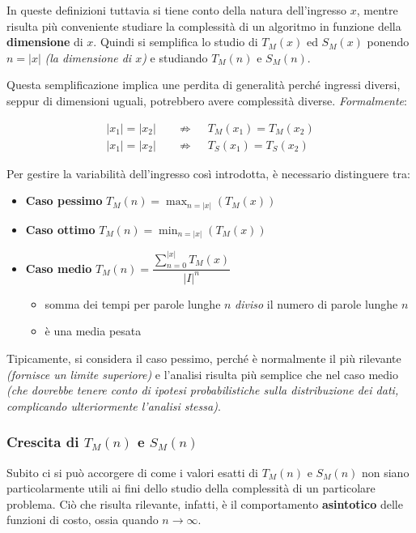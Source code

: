 \documentclass[italian, 10pt]{article}
\begin{document}
In queste definizioni tuttavia si tiene conto della natura dell'ingresso \(x\), mentre risulta più conveniente studiare la complessità di un algoritmo in funzione della \textbf{dimensione} di \(x\).
Quindi si semplifica lo studio di \(T_M(x)\) ed \(S_M(x)\) ponendo \(n = |x|\) \textit{(la dimensione di \(x\))} e studiando \(T_M(n)\) e \(S_M(n)\).

Questa semplificazione implica une perdita di generalità perché ingressi diversi, seppur di dimensioni uguali, potrebbero avere complessità diverse.
\textit{Formalmente}:

\begin{align*}
  |x_1| = |x_2| \quad & \nRightarrow \quad \ T_M(x_1) = T_M(x_2) \\
  |x_1| = |x_2| \quad & \nRightarrow \quad \ T_S(x_1) = T_S(x_2)
\end{align*}

\bigskip
Per gestire la variabilità dell'ingresso così introdotta, è necessario distinguere tra:
\begin{itemize}[itemsep=5pt]
  \item \textbf{Caso pessimo} \(T_M(n) = \displaystyle \max_{n = |x|} \left(T_M(x)\right) \)
  \item \textbf{Caso ottimo} \(T_M(n) = \displaystyle \min_{n = |x|} \left(T_M(x)\right) \)
  \item \textbf{Caso medio} \(T_M(n) = \dfrac{\displaystyle \sum_{n = 0}^{|x|} T_M(x)}{|I|^n} \)
        \begin{itemize}[label=\(\rightarrow\)]
          \item somma dei tempi per parole lunghe \(n\) \textit{diviso} il numero di parole lunghe \(n\)
          \item è una media pesata
        \end{itemize}
\end{itemize}

Tipicamente, si considera il caso pessimo, perché è normalmente il più rilevante \textit{(fornisce un limite superiore)} e l'analisi risulta più semplice che nel caso medio \textit{(che dovrebbe tenere conto di ipotesi probabilistiche sulla distribuzione dei dati, complicando ulteriormente l'analisi stessa)}.

\subsubsection[Crescita di T(n) e S(n)]{Crescita di \(T_M(n)\) e \(S_M(n)\)}

Subito ci si può accorgere di come i valori esatti di \(T_M(n)\) e \(S_M(n)\) non siano particolarmente utili ai fini dello studio della complessità di un particolare problema.
Ciò che risulta rilevante, infatti, è il comportamento \textbf{asintotico} delle funzioni di costo, ossia quando \(n \rightarrow \infty\).
\end{document}
